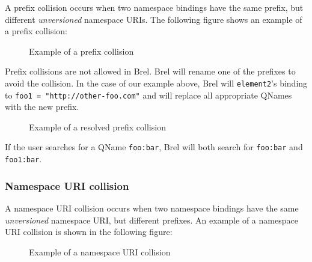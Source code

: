 A prefix collision occurs when two namespace bindings have the same prefix, but different \textit{unversioned} namespace URIs.
The following figure shows an example of a prefix collision:

\begin{figure}[H]
    \caption{Example of a prefix collision}
    \label{fig:prefix_collision_example}
\end{figure}

Prefix collisions are not allowed in Brel. Brel will rename one of the prefixes to avoid the collision.
In the case of our example above, Brel will \texttt{element2}'s binding to \texttt{foo1 = "http://other-foo.com"} and will replace all appropriate QNames with the new prefix.

\begin{figure}[H]
    \caption{Example of a resolved prefix collision}
    \label{fig:prefix_collision_example_renamed}
\end{figure}

If the user searches for a QName \texttt{foo:bar}, Brel will both search for \texttt{foo:bar} and \texttt{foo1:bar}.

\subsubsection{Namespace URI collision}

A namespace URI collision occurs when two namespace bindings have the same \textit{unversioned} namespace URI, 
but different prefixes.
An example of a namespace URI collision is shown in the following figure:

\begin{figure}[H]
    \caption{Example of a namespace URI collision}
    \label{fig:namespace_uri_collision_example}
\end{figure}

